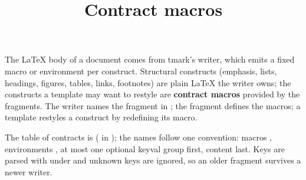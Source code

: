 \documentclass[a4paper,twoside]{article}
\title{Contract macros}
\author{}\date{}
\begin{document}
\maketitle
The \LaTeX{} body of a document comes from tmark's writer, which emits a
fixed macro or environment per construct. Structural constructs (emphasis,
lists, headings, figures, tables, links, footnotes) are plain \LaTeX{} the
writer owns; the constructs a template may want to restyle are \textbf{contract
macros} provided by the  fragments. The writer names the fragment in
; the fragment defines the macros; a template restyles a
construct by redefining its macro.

The table of contracts is  ( in
); the names follow one convention: macros ,
environments , at most one optional keyval group first, content
last. Keys are parsed with  under  and unknown keys
are ignored, so an older fragment survives a newer writer.
\end{document}

